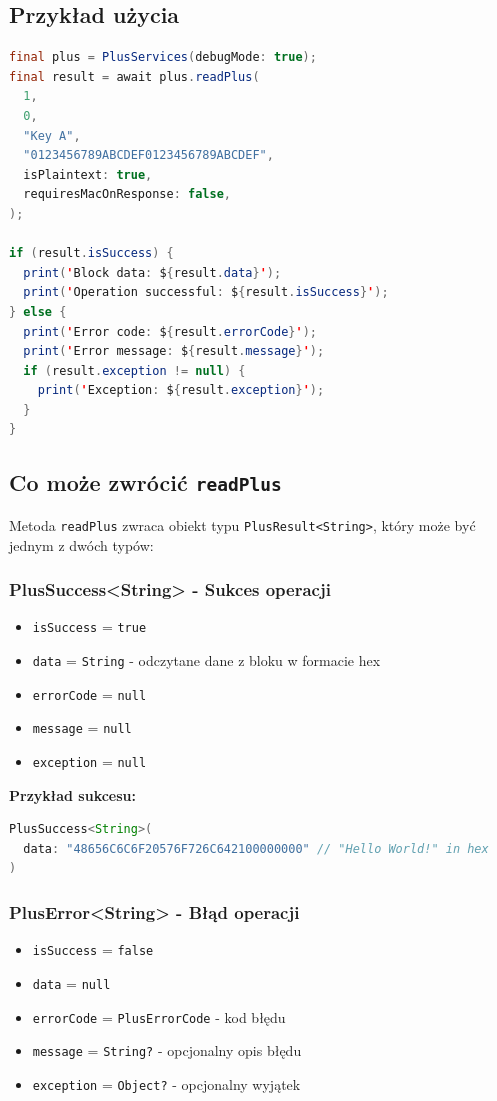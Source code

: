 \documentclass[a4paper,12pt]{article}
\begin{document}
\newpage

\subsection{Przykład użycia}
\begin{lstlisting}[language=Java]
final plus = PlusServices(debugMode: true);
final result = await plus.readPlus(
  1,
  0,
  "Key A",
  "0123456789ABCDEF0123456789ABCDEF",
  isPlaintext: true,
  requiresMacOnResponse: false,
);

if (result.isSuccess) {
  print('Block data: ${result.data}');
  print('Operation successful: ${result.isSuccess}');
} else {
  print('Error code: ${result.errorCode}');
  print('Error message: ${result.message}');
  if (result.exception != null) {
    print('Exception: ${result.exception}');
  }
}
\end{lstlisting}

\subsection{Co może zwrócić \texttt{readPlus}}

Metoda \texttt{readPlus} zwraca obiekt typu \texttt{PlusResult<String>}, który może być jednym z dwóch typów:

\subsubsection*{PlusSuccess<String> - Sukces operacji}
\begin{itemize}
    \item \texttt{isSuccess} = \texttt{true}
    \item \texttt{data} = \texttt{String} - odczytane dane z bloku w formacie hex
    \item \texttt{errorCode} = \texttt{null}
    \item \texttt{message} = \texttt{null}
    \item \texttt{exception} = \texttt{null}
\end{itemize}

\textbf{Przykład sukcesu:}
\begin{lstlisting}[language=Java]
PlusSuccess<String>(
  data: "48656C6C6F20576F726C642100000000" // "Hello World!" in hex
)
\end{lstlisting}

\newpage

\subsubsection*{PlusError<String> - Błąd operacji}
\begin{itemize}
    \item \texttt{isSuccess} = \texttt{false}
    \item \texttt{data} = \texttt{null}
    \item \texttt{errorCode} = \texttt{PlusErrorCode} - kod błędu
    \item \texttt{message} = \texttt{String?} - opcjonalny opis błędu
    \item \texttt{exception} = \texttt{Object?} - opcjonalny wyjątek
\end{itemize}
\end{document}
